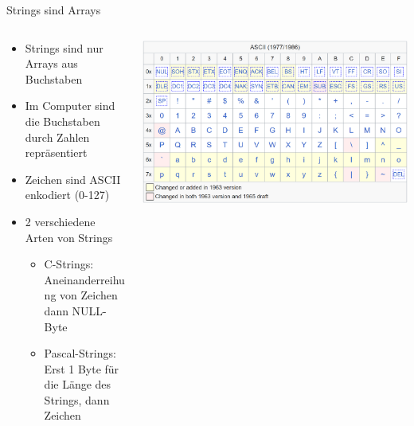 \documentclass[
  german,            %
  aspectratio=169,    %
]{tumbeamer}
\begin{document}
\begin{frame}[c]{Strings sind Arrays}{}
  \begin{columns}[c]
    \begin{column}{0.5\textwidth}
      \begin{itemize}
        \item Strings sind nur Arrays aus Buchstaben
        \item Im Computer sind die Buchstaben durch Zahlen repräsentiert
        \item Zeichen sind ASCII enkodiert (0-127)
        \item 2 verschiedene Arten von Strings
        \begin{itemize}
          \item C-Strings: Aneinanderreihung von Zeichen dann NULL-Byte
          \item Pascal-Strings: Erst 1 Byte für die Länge des Strings, dann Zeichen
        \end{itemize}
      \end{itemize}
    \end{column}
    \begin{column}{0.5\textwidth}
      \includegraphics[width=\linewidth]{ascii.png}
    \end{column}
  \end{columns}
\end{frame}
\end{document}
